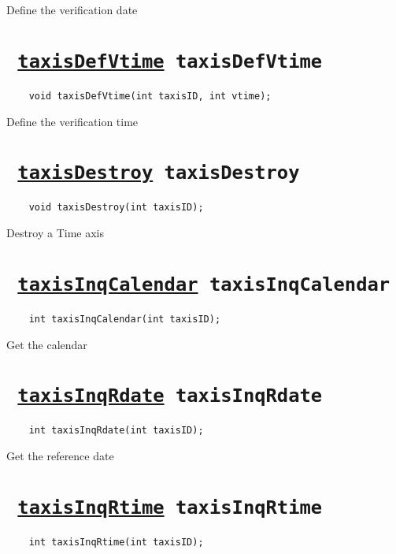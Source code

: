 Define the verification date
\ifpdfoutput{}{(\ref{taxisDefVdate})}


\section*{\texttt{ 
\ifpdf
\hyperref[taxisDefVtime]{taxisDefVtime}
\else
taxisDefVtime
\fi
}}
\begin{verbatim}
    void taxisDefVtime(int taxisID, int vtime);
\end{verbatim}

Define the verification time
\ifpdfoutput{}{(\ref{taxisDefVtime})}


\section*{\texttt{ 
\ifpdf
\hyperref[taxisDestroy]{taxisDestroy}
\else
taxisDestroy
\fi
}}
\begin{verbatim}
    void taxisDestroy(int taxisID);
\end{verbatim}

Destroy a Time axis
\ifpdfoutput{}{(\ref{taxisDestroy})}


\section*{\texttt{ 
\ifpdf
\hyperref[taxisInqCalendar]{taxisInqCalendar}
\else
taxisInqCalendar
\fi
}}
\begin{verbatim}
    int taxisInqCalendar(int taxisID);
\end{verbatim}

Get the calendar
\ifpdfoutput{}{(\ref{taxisInqCalendar})}


\section*{\texttt{ 
\ifpdf
\hyperref[taxisInqRdate]{taxisInqRdate}
\else
taxisInqRdate
\fi
}}
\begin{verbatim}
    int taxisInqRdate(int taxisID);
\end{verbatim}

Get the reference date
\ifpdfoutput{}{(\ref{taxisInqRdate})}


\section*{\texttt{ 
\ifpdf
\hyperref[taxisInqRtime]{taxisInqRtime}
\else
taxisInqRtime
\fi
}}
\begin{verbatim}
    int taxisInqRtime(int taxisID);
\end{verbatim}

